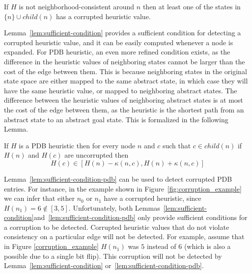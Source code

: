 \begin{lemma} 
If $H$ is not neighborhood-consistent around $n$ then at least one of the states in $\{n\}\cup child(n)$ has a corrupted heuristic value. 
\label{lem:sufficient-condition}
\end{lemma}
Lemma~\ref{lem:sufficient-condition} provides a sufficient condition for detecting a corrupted heuristic value, and it can be easily computed whenever a node is expanded. For PDB heuristic, an even more refined condition exists, as the difference in the heuristic values of neighboring states cannot be larger than the cost of the edge between them. This is because neighboring states in the original state space are either mapped to the same abstract state, in which case they will have the same heuristic value, or mapped to neighboring abstract states. The difference between the heuristic values of neighboring abstract states is at most the cost of the edge between them, as the heuristic is the shortest path from an abstract state to an abstract goal state. This is formalized in the following Lemma. 
\begin{lemma}
If $H$ is a PDB heuristic then for every node $n$ and $c$ such that $c\in child(n)$ if $H(n)$ and $H(c)$ are uncorrupted then 
\[ H(c)\in [H(n)-\kappa(n,c),H(n)+\kappa(n,c)] \]
\label{lem:sufficient-condition-pdb}
\end{lemma}
Lemma~\ref{lem:sufficient-condition-pdb} can be used to detect corrupted PDB entries. For instance, in the example shown in Figure~\ref{fig:corruption_example} we can infer that either $n_0$ or $n_1$ have a corrupted heuristic, since $H(n_1)=6\notin [3,5]$.
Unfortunately, both Lemmas~\ref{lem:sufficient-condition}and~\ref{lem:sufficient-condition-pdb} only provide sufficient conditions for a corruption to be detected.  Corrupted heuristic values that do not violate consistency on a particular edge will not be detected. 
For example, assume that in Figure \ref{corruption_example} $H(n_1)$ was $5$ instead of $6$ (which is also a possible due to a single bit flip). This corruption will not be detected by 
Lemma~\ref{lem:sufficient-condition} or~\ref{lem:sufficient-condition-pdb}.